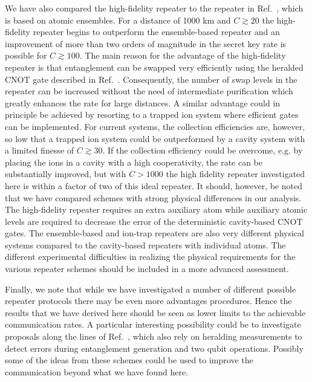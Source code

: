 We have also compared the high-fidelity repeater to the repeater in
Ref.~\cite{sangouard1}, which is based on atomic ensembles. For a distance of
1000 km and $C\gtrsim20$ the high-fidelity repeater begins to outperform the
ensemble-based repeater and an improvement of more than two orders of magnitude
in the secret key rate is possible for $C\gtrsim100$. The main reason for the
advantage of the high-fidelity repeater is that entanglement can be swapped very
efficiently using the heralded CNOT gate described in Ref.~\cite{Borregaard2015a}.
Consequently, the number of swap levels in the repeater can be increased without
the need of intermediate purification which greatly enhances the rate for large
distances. A similar advantage could in principle be achieved by resorting to a
trapped ion system where efficient gates can be implemented. For current
systems, the collection efficiencies are, however, so low that a trapped ion
system could be outperformed by a cavity system with a limited finesse of
$C\gtrsim 30$. If the collection efficiency could be overcome, e.g. by placing
the ions in a cavity with a high cooperativity, the rate can be substantially
improved, but with $C>1000$ the high fidelity repeater investigated here is
within a factor of two of this ideal repeater. It should, however, be noted that
we have compared schemes with strong physical differences in our analysis. The
high-fidelity repeater requires an extra auxiliary atom while auxiliary atomic
levels are required to decrease the error of the deterministic cavity-based CNOT
gates. The ensemble-based and ion-trap repeaters are also very different
physical systems compared to the cavity-based repeaters with individual atoms.
The different experimental difficulties in realizing the physical requirements
for the various repeater schemes should be included in a more advanced
assessment.

Finally, we note that while we have investigated a number of different possible
repeater protocols there may be even more advantages procedures. Hence the
results that we have derived here should be seen as lower limits to the
achievable communication rates. A particular interesting  possibility could be
to investigate proposals along the lines of Ref.~\cite{cirac1,cirac2}, which
also rely on heralding measurements to detect errors during entanglement
generation and two qubit operations.  Possibly some of the ideas from these
schemes could be used to improve the communication beyond what we have found
here.
